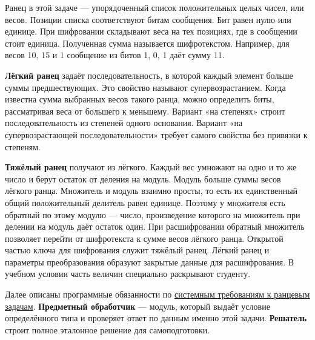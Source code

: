 \documentclass[12pt,a4paper]{article}
\begin{document}
\hypertarget{как-устроена-ранцевая-задача}{}

Ранец в этой задаче --- упорядоченный список положительных целых чисел, или весов. Позиции списка соответствуют битам сообщения. Бит равен нулю или единице. При шифровании складывают веса на тех позициях, где в сообщении стоит единица. Полученная сумма называется шифротекстом. Например, для весов 10, 15 и 1 сообщение из битов 1, 0, 1 даёт сумму 11.

\textbf{Лёгкий ранец} задаёт последовательность, в которой каждый элемент больше суммы предшествующих. Это свойство называют супервозрастанием. Когда известна сумма выбранных весов такого ранца, можно определить биты, рассматривая веса от большего к меньшему. Вариант «на степенях» строит последовательность из степеней одного основания. Вариант «на супервозрастающей последовательности» требует самого свойства без привязки к степеням.

\textbf{Тяжёлый ранец} получают из лёгкого. Каждый вес умножают на одно и то же число и берут остаток от деления на модуль. Модуль больше суммы весов лёгкого ранца. Множитель и модуль взаимно просты, то есть их единственный общий положительный делитель равен единице. Поэтому у множителя есть обратный по этому модулю --- число, произведение которого на множитель при делении на модуль даёт остаток один. При расшифровании обратный множитель позволяет перейти от шифротекста к сумме весов лёгкого ранца. Открытой частью ключа для шифрования служит тяжёлый ранец. Лёгкий ранец и параметры преобразования образуют закрытые данные для расшифрования. В учебном условии часть величин специально раскрывают студенту.

Далее описаны программные обязанности по {\href{../04\_Системные\_требования/DOC-05\_Системные\_требования.pdf\#doc-05-требования-к-ранцевым-задачам}{системным требованиям к ранцевым задачам}}. \textbf{Предметный обработчик} --- модуль, который выдаёт условие определённого типа и проверяет ответ по данным именно этой задачи. \textbf{Решатель} строит полное эталонное решение для самоподготовки.
\end{document}
